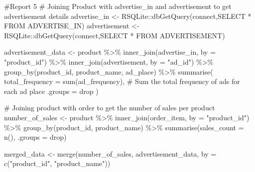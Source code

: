 \documentclass[
  letterpaper,
  DIV=11,
  numbers=noendperiod]{scrartcl}
\newenvironment{Shaded}{\begin{snugshade}}{\end{snugshade}}
\newcommand{\AttributeTok}[1]{\textcolor[rgb]{0.40,0.45,0.13}{#1}}
\newcommand{\CommentTok}[1]{\textcolor[rgb]{0.37,0.37,0.37}{#1}}
\newcommand{\FunctionTok}[1]{\textcolor[rgb]{0.28,0.35,0.67}{#1}}
\newcommand{\NormalTok}[1]{\textcolor[rgb]{0.00,0.23,0.31}{#1}}
\newcommand{\OtherTok}[1]{\textcolor[rgb]{0.00,0.23,0.31}{#1}}
\newcommand{\SpecialCharTok}[1]{\textcolor[rgb]{0.37,0.37,0.37}{#1}}
\newcommand{\StringTok}[1]{\textcolor[rgb]{0.13,0.47,0.30}{#1}}
\begin{document}
\begin{Shaded}
\begin{Highlighting}[]
\CommentTok{\#Report 5}
\CommentTok{\# Joining Product with advertise\_in and advertisement to get advertisement details}
\NormalTok{advertise\_in }\OtherTok{\textless{}{-}}\NormalTok{ RSQLite}\SpecialCharTok{::}\FunctionTok{dbGetQuery}\NormalTok{(connect,}\StringTok{\textquotesingle{}SELECT * FROM ADVERTISE\_IN\textquotesingle{}}\NormalTok{)}
\NormalTok{advertisement }\OtherTok{\textless{}{-}}\NormalTok{ RSQLite}\SpecialCharTok{::}\FunctionTok{dbGetQuery}\NormalTok{(connect,}\StringTok{\textquotesingle{}SELECT * FROM ADVERTISEMENT\textquotesingle{}}\NormalTok{)}

\NormalTok{advertisement\_data }\OtherTok{\textless{}{-}}\NormalTok{ product }\SpecialCharTok{\%\textgreater{}\%}
  \FunctionTok{inner\_join}\NormalTok{(advertise\_in, }\AttributeTok{by =} \StringTok{"product\_id"}\NormalTok{) }\SpecialCharTok{\%\textgreater{}\%}
  \FunctionTok{inner\_join}\NormalTok{(advertisement, }\AttributeTok{by =} \StringTok{"ad\_id"}\NormalTok{) }\SpecialCharTok{\%\textgreater{}\%}
  \FunctionTok{group\_by}\NormalTok{(product\_id, product\_name, ad\_place) }\SpecialCharTok{\%\textgreater{}\%}
  \FunctionTok{summarise}\NormalTok{(}
    \AttributeTok{total\_frequency =} \FunctionTok{sum}\NormalTok{(ad\_frequency), }\CommentTok{\# Sum the total frequency of ads for each ad place}
    \AttributeTok{.groups =} \StringTok{\textquotesingle{}drop\textquotesingle{}}\NormalTok{ )}


\CommentTok{\# Joining product with order to get the number of sales per product}
\NormalTok{number\_of\_sales }\OtherTok{\textless{}{-}}\NormalTok{ product }\SpecialCharTok{\%\textgreater{}\%}
  \FunctionTok{inner\_join}\NormalTok{(order\_item, }\AttributeTok{by =} \StringTok{"product\_id"}\NormalTok{) }\SpecialCharTok{\%\textgreater{}\%}
  \FunctionTok{group\_by}\NormalTok{(product\_id, product\_name) }\SpecialCharTok{\%\textgreater{}\%}
  \FunctionTok{summarise}\NormalTok{(}\AttributeTok{sales\_count =} \FunctionTok{n}\NormalTok{(), }\AttributeTok{.groups =} \StringTok{\textquotesingle{}drop\textquotesingle{}}\NormalTok{)}



\NormalTok{merged\_data }\OtherTok{\textless{}{-}} \FunctionTok{merge}\NormalTok{(number\_of\_sales, advertisement\_data, }\AttributeTok{by =} \FunctionTok{c}\NormalTok{(}\StringTok{"product\_id"}\NormalTok{, }\StringTok{"product\_name"}\NormalTok{))}




\end{Highlighting}
\end{Shaded}
\end{document}
